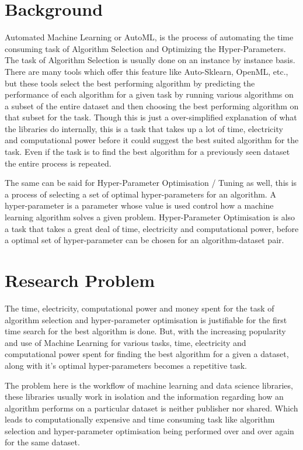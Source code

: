 \section{Background}
Automated Machine Learning or AutoML, is the process of automating the time consuming task of Algorithm Selection and Optimizing the Hyper-Parameters. The task of Algorithm Selection is usually done on an instance by instance basis. There are many tools which offer this feature like Auto-Sklearn, OpenML, etc., but these tools select the best performing algorithm by predicting the performance of each algorithm for a given task by running various algorithms on a subset of the entire dataset and then choosing the best performing algorithm on that subset for the task. Though this is just a over-simplified explanation of what the libraries do internally, this is a task that takes up a lot of time, electricity and computational power before it could suggest the best suited algorithm for the task. Even if the task is to find the best algorithm for a previously seen dataset the entire process is repeated.

The same can be said for Hyper-Parameter Optimisation / Tuning as well, this is a process of selecting a set of optimal hyper-parameters for an algorithm. A hyper-parameter is a parameter whose value is used control how a machine learning algorithm solves a given problem. Hyper-Parameter Optimisation is also a task that takes a great deal of time, electricity and computational power, before a optimal set of hyper-parameter can be chosen for an algorithm-dataset pair.

\section{Research Problem}
The time, electricity, computational power and money spent for the task of algorithm selection and hyper-parameter optimisation is justifiable for the first time search for the best algorithm is done. But, with the increasing popularity and use of Machine Learning for various tasks, time, electricity and computational power spent for finding the best algorithm for a given a dataset, along with it's optimal hyper-parameters becomes a repetitive task.

The problem here is the workflow of machine learning and data science libraries, these libraries usually work in isolation and the information regarding how an algorithm performs on a particular dataset is neither publisher nor shared. Which leads to computationally expensive and time consuming task like algorithm selection and hyper-parameter optimisation being performed over and over again for the same dataset.

